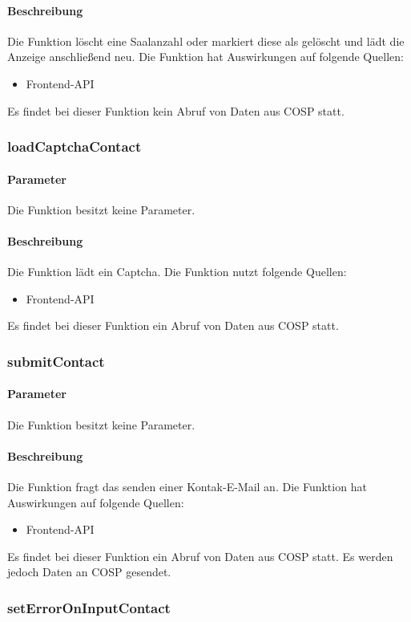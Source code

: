 \paragraph{Beschreibung} Die Funktion löscht eine Saalanzahl oder markiert diese als gelöscht und lädt die Anzeige anschließend neu. Die Funktion hat Auswirkungen auf folgende Quellen:
\begin{itemize}
	\item Frontend-API
\end{itemize}
Es findet bei dieser Funktion kein Abruf von Daten aus {\glqq COSP\grqq} statt.
\subsubsection{loadCaptchaContact}
\paragraph{Parameter} Die Funktion besitzt keine Parameter.
\paragraph{Beschreibung} Die Funktion lädt ein Captcha. Die Funktion nutzt folgende Quellen:
\begin{itemize}
	\item Frontend-API
\end{itemize}
Es findet bei dieser Funktion ein Abruf von Daten aus {\glqq COSP\grqq} statt.
\subsubsection{submitContact}
\paragraph{Parameter} Die Funktion besitzt keine Parameter.
\paragraph{Beschreibung} Die Funktion fragt das senden einer Kontak-E-Mail an. Die Funktion hat Auswirkungen auf folgende Quellen:
\begin{itemize}
	\item Frontend-API
\end{itemize}
Es findet bei dieser Funktion ein Abruf von Daten aus {\glqq COSP\grqq} statt. Es werden jedoch Daten an {\glqq COSP\grqq} gesendet.
\subsubsection{setErrorOnInputContact}
